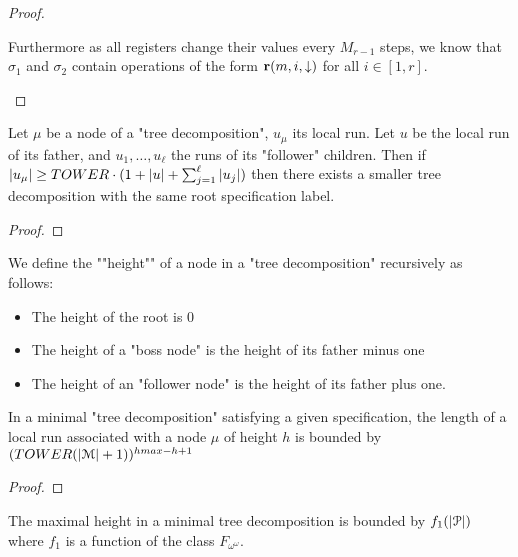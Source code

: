 \begin{proof}
\begin{itemize}
		Furthermore as all registers change their values every $M_{r-1}$ steps, we know that $\sigma_1$ and $\sigma_2$ contain operations of the form $\textbf{r}(m, i, \downarrow)$ for all $i \in [1,r]$.   
	\end{itemize}
\end{proof}
\fi

\begin{lemma}
	Let $\mu$ be a node of a "tree decomposition", $u_\mu$ its local run.
	Let $u$ be the local run of its father, and $u_1, \ldots, u_\ell$ the runs of its "follower" children.
	Then if $|u_\mu| \geq TOWER \cdot (1+ |u|+ \sum_{j=1}^{\ell} |u_j|)$ then there exists a smaller tree decomposition with the same root specification label.
\end{lemma}

\begin{proof}
\end{proof}

\begin{definition}
	We define the ""height"" of a node in a "tree decomposition" recursively as follows:
	\begin{itemize}
		\item The height of the root is $0$
		
		\item The height of a "boss node" is the height of its father minus one
		
		\item The height of an "follower node" is the height of its father plus one.
	\end{itemize}
\end{definition}

\begin{lemma}
	\label{lem:bound-length-at-height-h}
	In a minimal "tree decomposition" satisfying a given specification, the length of a local run associated with a node $\mu$ of height $h$ is bounded by $(TOWER (|\mathcal{M}|+1))^{hmax-h+1}$
\end{lemma}

\begin{proof}
\end{proof}

\begin{lemma}
	\label{lem:bound-max-height}
	The maximal height in a minimal tree decomposition is bounded by $f_1(|\mathcal{P}|)$ where $f_1$ is a function of the class $F_{\omega^\omega}$.
\end{lemma}

